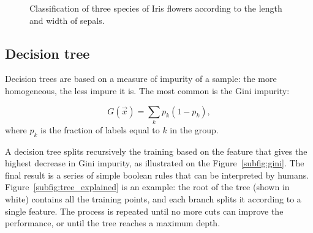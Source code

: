 \begin{figure}[htb]
	\centering
	\hfill
	\caption{Classification of three species of Iris flowers according to the length and width of sepals.}\label{fig:knn}
\end{figure}

\subsection{Decision tree}\label{sec:decision_tree}
Decision trees are based on a measure of impurity of a sample: the more homogeneous, the less impure it is.
The most common is the Gini impurity:

\[ G(\vec x) = \sum_k p_{k} (1-p_k),\]
where $p_k$ is the fraction of labels equal to $k$ in the group.

A decision tree splits recursively the training based on the feature that gives the highest decrease in Gini impurity, as illustrated on the Figure~\ref{subfig:gini}.
The final result is a series of simple boolean rules that can be interpreted by humans.
Figure~\ref{subfig:tree_explained} is an example: the root of the tree (shown in white) contains all the training points, and each branch splits it according to a single feature.
The process is repeated until no more cuts can improve the performance, or until the tree reaches a maximum depth.


